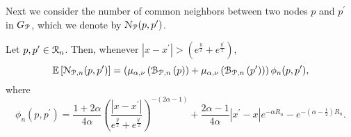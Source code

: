 %	
%	
%	
%    
%    
%    
%    
%    
%    
%    
%    
%    
%    
%    
%    

Next we consider the number of common neighbors between two nodes $p$ and $p^\prime$ in $G_{{\mathcal P}}$, which we denote by ${\mathcal N}_{{\mathcal P}}(p,p^\prime)$. 

\begin{lemma}\label{lem:common_neighbors_Pcal_n}
Let $p, p^\prime \in {\mathcal R}_n$. Then, whenever $|x - x^\prime| > \left(e^{\frac{y}{2}} + e^{\frac{y^\prime}{2}}\right)$,
\[
	\mathbb{E}\left[{\mathcal N}_{{\mathcal P},n}(p,p^\prime)\right] = \left(\mu_{\alpha,\nu}\left({\mathcal B}_{{\mathcal P},n}\left(p\right)\right) + \mu_{\alpha,\nu}\left({\mathcal B}_{{\mathcal P},n}\left(p^\prime\right)\right)\right)\phi_n(p,p^\prime),
\]
where
\[
	\phi_n(p,p^\prime) = \frac{1 + 2\alpha}{4\alpha}\left(\frac{|x - x^\prime|}{e^{\frac{y}{2}} + e^{\frac{y^\prime}{2}}}\right)^{-(2\alpha - 1)} 
	+ \frac{2\alpha - 1}{4\alpha}|x^\prime - x|e^{-\alpha R_n} - e^{-(\alpha - \frac{1}{2})R_n}. 
\]
\end{lemma}

